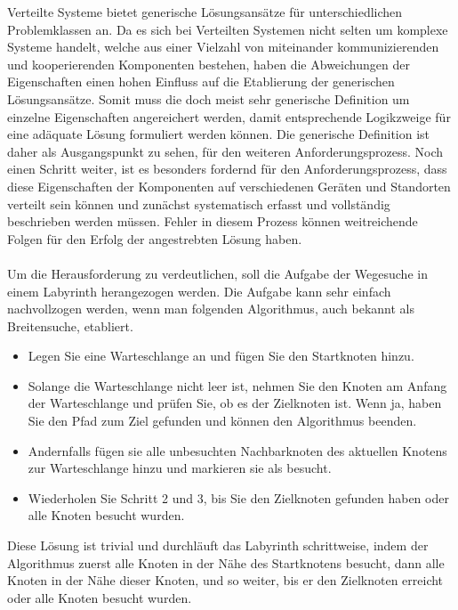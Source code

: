Verteilte Systeme bietet generische Lösungsansätze für unterschiedlichen Problemklassen an. Da es sich bei Verteilten Systemen nicht selten um komplexe Systeme handelt, welche aus einer Vielzahl von miteinander kommunizierenden und kooperierenden Komponenten bestehen, haben die Abweichungen der Eigenschaften einen hohen Einfluss auf die Etablierung der generischen Lösungsansätze. Somit muss die doch meist sehr generische Definition um einzelne Eigenschaften angereichert werden, damit entsprechende Logikzweige für eine adäquate Lösung formuliert werden können. Die generische Definition ist daher als Ausgangspunkt zu sehen, für den weiteren Anforderungsprozess. Noch einen Schritt weiter, ist es besonders fordernd für den Anforderungsprozess, dass diese Eigenschaften der Komponenten auf verschiedenen Geräten und Standorten verteilt sein können und zunächst systematisch erfasst und vollständig beschrieben werden müssen. Fehler in diesem Prozess können weitreichende Folgen für den Erfolg der angestrebten Lösung haben. 
\\\\
Um die Herausforderung zu verdeutlichen, soll die Aufgabe der Wegesuche in einem Labyrinth herangezogen werden. Die Aufgabe kann sehr einfach nachvollzogen werden, wenn man folgenden Algorithmus, auch bekannt als Breitensuche, etabliert. 

\begin{itemize}
\item Legen Sie eine Warteschlange an und fügen Sie den Startknoten hinzu.

\item Solange die Warteschlange nicht leer ist, nehmen Sie den Knoten am Anfang der Warteschlange und prüfen Sie, ob es der Zielknoten ist. Wenn ja, haben Sie den Pfad zum Ziel gefunden und können den Algorithmus beenden.

\item Andernfalls fügen sie alle unbesuchten Nachbarknoten des aktuellen Knotens zur Warteschlange hinzu und markieren sie als besucht.

\item Wiederholen Sie Schritt 2 und 3, bis Sie den Zielknoten gefunden haben oder alle Knoten besucht wurden.
\end{itemize}
Diese Lösung ist trivial und durchläuft das Labyrinth schrittweise, indem der Algorithmus zuerst alle Knoten in der Nähe des Startknotens besucht, dann alle Knoten in der Nähe dieser Knoten, und so weiter, bis er den Zielknoten erreicht oder alle Knoten besucht wurden.


